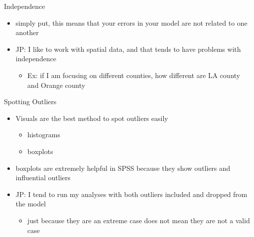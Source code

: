 \documentclass[
  ignorenonframetext,
]{beamer}
\providecommand{\tightlist}{%
  \setlength{\itemsep}{0pt}\setlength{\parskip}{0pt}}
\begin{document}
\begin{frame}{Independence}
\protect\hypertarget{independence}{}
\begin{itemize}
\item
  simply put, this means that your errors in your model are not related
  to one another
\item
  JP: I like to work with spatial data, and that tends to have problems
  with independence

  \begin{itemize}
  \tightlist
  \item
    Ex: if I am focusing on different counties, how different are LA
    county and Orange county
  \end{itemize}
\end{itemize}
\end{frame}

\begin{frame}{Spotting Outliers}
\protect\hypertarget{spotting-outliers}{}
\begin{itemize}
\item
  Visuals are the best method to spot outliers easily

  \begin{itemize}
  \item
    histograms
  \item
    boxplots
  \end{itemize}
\item
  boxplots are extremely helpful in SPSS because they show outliers and
  influential outliers
\item
  JP: I tend to run my analyses with both outliers included and dropped
  from the model

  \begin{itemize}
  \tightlist
  \item
    just because they are an extreme case does not mean they are not a
    valid case
  \end{itemize}
\end{itemize}
\end{frame}
\end{document}
